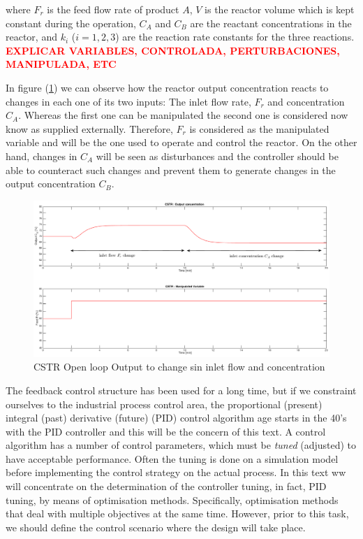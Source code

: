 \noindent where $F_r$ is the feed flow rate of product $A$, $V$ is the reactor volume which is kept constant during the operation, $C_A$ and $C_B$ are the reactant concentrations in the reactor, and $k_i$ ($i=1,2,3$) are the reaction rate constants for the three reactions.\\

\textcolor{red}{\bf EXPLICAR VARIABLES, CONTROLADA, PERTURBACIONES, MANIPULADA, ETC}

In figure (\ref{Ch2fig:CSTRFigureOpenLoop}) we can observe how the reactor output concentration reacts to changes in each one of its two inputs: The inlet flow rate, $F_r$ and concentration $C_A$. Whereas the first one can be manipulated the second one is considered now know as supplied externally. Therefore, $F_r$ is considered as the manipulated variable and will be the one used to operate and control the reactor. On the other hand, changes in $C_A$ will be seen as disturbances and the controller should be able to counteract such changes and prevent them to generate changes in the output concentration $C_B$. 

\begin{figure}[htb!]
\centering
\includegraphics[width=1\linewidth]{../figuras/Ch2FigureOpenLoop}
\caption{CSTR Open loop Output to change sin inlet flow and concentration} 
\label{Ch2fig:CSTRFigureOpenLoop}
\end{figure}


The feedback control structure has been used for a long time, but if we constraint ourselves to the industrial process control area, the proportional (present) integral (past) derivative (future) (PID) control algorithm age starts in the 40's  with the PID controller and this will be the concern of this text.  A control algorithm has a number of control parameters, which must be \emph{tuned} (adjusted) to have acceptable performance. Often the tuning is done on a simulation model before implementing the control strategy on the actual process. In this text ww will concentrate on the determination of the controller tuning, in fact, PID tuning, by means of optimisation methods. Specifically, optimisation methods that deal with multiple objectives at the same time. However, prior to this task, we should define the control scenario where the design will take place.\\

